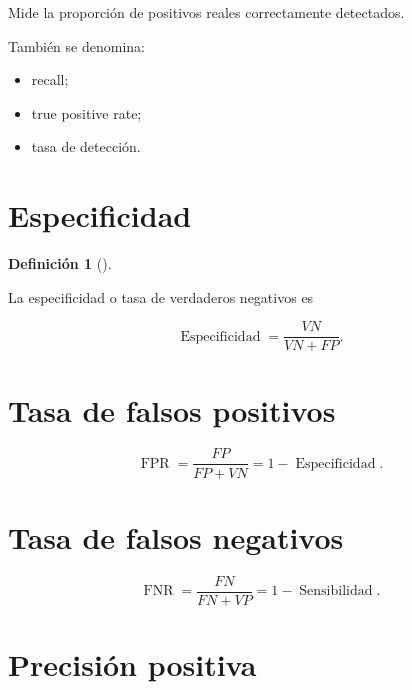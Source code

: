 \documentclass[
  spanish,
  10.5pt,
  letterpaper,
  DIV=11,
  numbers=noendperiod,
  oneside,
  open=any]{scrreprt}
\providecommand{\tightlist}{%
  \setlength{\itemsep}{0pt}\setlength{\parskip}{0pt}}
\theoremstyle{definition}
\newtheorem{definition}{Definición}[chapter]
\theoremstyle{definition}
\theoremstyle{plain}
\theoremstyle{remark}
\begin{document}
Mide la proporción de positivos reales correctamente detectados.

También se denomina:

\begin{itemize}
\tightlist
\item
  recall;
\item
  true positive rate;
\item
  tasa de detección.
\end{itemize}

\section*{Especificidad}\label{especificidad}


\begin{definition}[]\protect\hypertarget{def-especificidad}{}\label{def-especificidad}

La especificidad o tasa de verdaderos negativos es

\[
\operatorname{Especificidad}
=
\frac{
VN
}{
VN+FP
}.
\]

\end{definition}

\section*{Tasa de falsos positivos}\label{tasa-de-falsos-positivos}


\[
\operatorname{FPR}
=
\frac{
FP
}{
FP+VN
}
=
1-
\operatorname{Especificidad}.
\]

\section*{Tasa de falsos negativos}\label{tasa-de-falsos-negativos}


\[
\operatorname{FNR}
=
\frac{
FN
}{
FN+VP
}
=
1-
\operatorname{Sensibilidad}.
\]

\section*{Precisión positiva}\label{precisiuxf3n-positiva}
\end{document}
